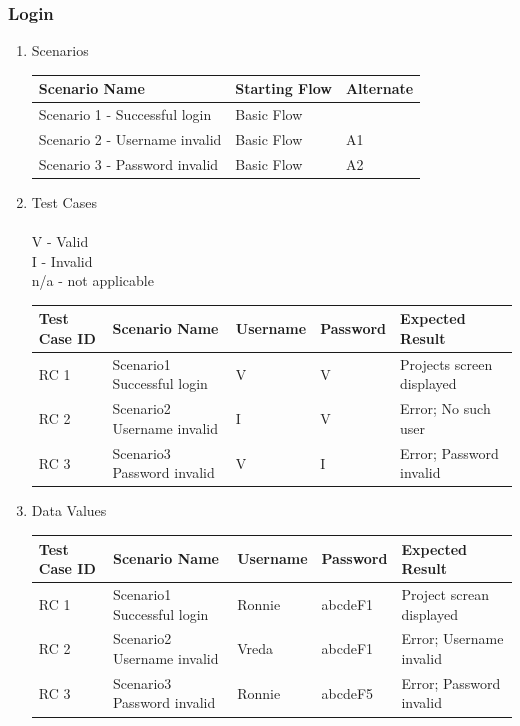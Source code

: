 \documentclass[hidelinks, 12pt, oneside]{article}
\begin{document}
\subsubsection{Login}
\begin{enumerate}
\item Scenarios

\begin{center}
 \begin{tabu}to 0.8\textwidth{|X[l]| X|X|} 
 \hline
 Scenario Name & Starting Flow & Alternate \\ [1ex]
 \hline
 Scenario 1 - Successful login & Basic Flow &\\ [1ex]
 \hline
 Scenario 2 - Username invalid & Basic Flow & A1  \\[1ex]
 \hline
 Scenario 3 - Password invalid & Basic Flow & A2  \\[1ex]
 \hline
\end{tabu}
\end{center}

\item Test Cases\\
\\V - Valid\\ I - Invalid\\ n/a - not applicable
\begin{center}
\begin{tabu}to 1.1\textwidth{|X[l]|X|X|X|X|} 
 \hline
 Test Case ID & Scenario Name & Username & Password & Expected Result \\ [0.1ex]
 \hline
  RC 1 & Scenario1 Successful login & V & V & Projects screen displayed\\ [0.1ex]
 \hline
 RC 2 & Scenario2 Username invalid & I&V&Error; No such user \\[0.1ex]
 \hline
  RC 3 & Scenario3 Password invalid & V&I&Error; Password invalid\\[0.1ex]
 \hline

\end{tabu}
\end{center}
\item Data Values
\begin{center}
\begin{tabu}to 1.1\textwidth{|X[l]|X|X|X|X|} 
 \hline
 Test Case ID & Scenario Name & Username & Password & Expected Result \\ [0.1ex]
 \hline
  RC 1 & Scenario1 Successful login & Ronnie & abcdeF1 & Project screan displayed\\ [0.1ex]
 \hline
 RC 2 & Scenario2 Username invalid & Vreda&abcdeF1&Error; Username invalid \\[0.1ex]
 \hline
  RC 3 & Scenario3 Password invalid &Ronnie&abcdeF5&Error; Password invalid\\[0.1ex]
 \hline
\end{tabu}
\end{center}
\end{enumerate}
\end{document}
